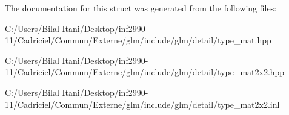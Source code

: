 The documentation for this struct was generated from the following files\+:\begin{DoxyCompactItemize}
\item 
C\+:/\+Users/\+Bilal Itani/\+Desktop/inf2990-\/11/\+Cadriciel/\+Commun/\+Externe/glm/include/glm/detail/type\+\_\+mat.\+hpp\item 
C\+:/\+Users/\+Bilal Itani/\+Desktop/inf2990-\/11/\+Cadriciel/\+Commun/\+Externe/glm/include/glm/detail/type\+\_\+mat2x2.\+hpp\item 
C\+:/\+Users/\+Bilal Itani/\+Desktop/inf2990-\/11/\+Cadriciel/\+Commun/\+Externe/glm/include/glm/detail/type\+\_\+mat2x2.\+inl\end{DoxyCompactItemize}
